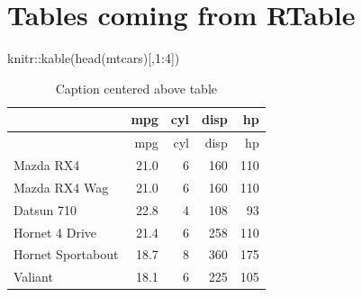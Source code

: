\documentclass[
  super,
  preprint,
  3p]{elsarticle}
\newenvironment{Shaded}{\begin{snugshade}}{\end{snugshade}}
\newcommand{\DecValTok}[1]{\textcolor[rgb]{0.68,0.00,0.00}{#1}}
\newcommand{\FunctionTok}[1]{\textcolor[rgb]{0.28,0.35,0.67}{#1}}
\newcommand{\NormalTok}[1]{\textcolor[rgb]{0.00,0.23,0.31}{#1}}
\newcommand{\SpecialCharTok}[1]{\textcolor[rgb]{0.37,0.37,0.37}{#1}}
\begin{document}
\begin{verbatim}
\end{verbatim}

\hypertarget{tables-coming-from-rtable}{%
\section{Tables coming from RTable}\label{tables-coming-from-rtable}}

\begin{Shaded}
\begin{Highlighting}[]
\NormalTok{knitr}\SpecialCharTok{::}\FunctionTok{kable}\NormalTok{(}\FunctionTok{head}\NormalTok{(mtcars)[,}\DecValTok{1}\SpecialCharTok{:}\DecValTok{4}\NormalTok{])}
\end{Highlighting}
\end{Shaded}

\hypertarget{tbl-simple}{}
\begin{longtable}[]{@{}lrrrr@{}}
\caption{\label{tbl-simple}Caption centered above table}\tabularnewline
\toprule\noalign{}
& mpg & cyl & disp & hp \\
\midrule\noalign{}
\endfirsthead
\toprule\noalign{}
& mpg & cyl & disp & hp \\
\midrule\noalign{}
\endhead
\bottomrule\noalign{}
\endlastfoot
Mazda RX4 & 21.0 & 6 & 160 & 110 \\
Mazda RX4 Wag & 21.0 & 6 & 160 & 110 \\
Datsun 710 & 22.8 & 4 & 108 & 93 \\
Hornet 4 Drive & 21.4 & 6 & 258 & 110 \\
Hornet Sportabout & 18.7 & 8 & 360 & 175 \\
Valiant & 18.1 & 6 & 225 & 105 \\
\end{longtable}


  
\end{document}
